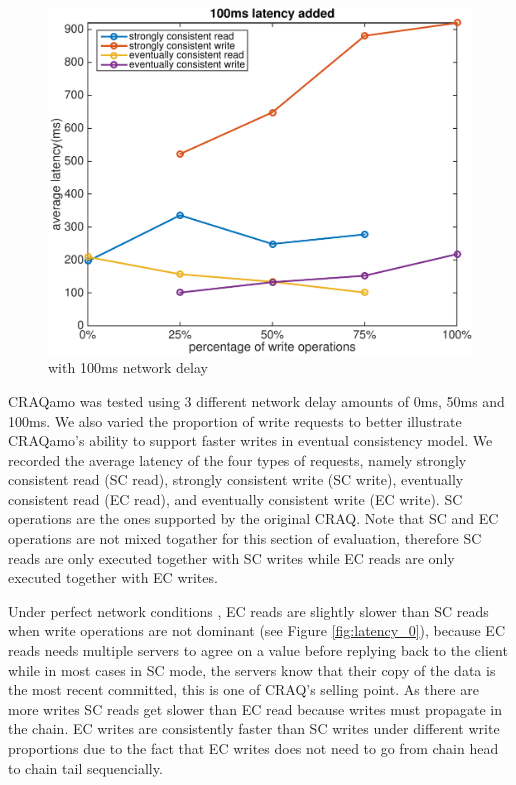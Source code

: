 \begin{figure}[hbt]
\centering
\includegraphics[width=\linewidth]{figures/latency_100.pdf}
\caption{with 100ms network delay}
\label{fig:latency_100}
\end{figure}
\vspace{-2mm}


CRAQamo was tested using 3 different network delay amounts of 0ms, 50ms and 100ms. We also varied the proportion of write requests to better illustrate CRAQamo's ability to support faster writes in eventual consistency model. We recorded the average latency of the four types of requests, namely strongly consistent read (SC read), strongly consistent write (SC write), eventually consistent read (EC read), and eventually consistent write (EC write). SC operations are the ones supported by the original CRAQ. Note that SC and EC operations are not mixed togather for this section of evaluation, therefore SC reads are only executed together with SC writes while EC reads are only executed together with EC writes. 

Under perfect network conditions , EC reads are slightly slower than SC reads when write operations are not dominant (see Figure \ref{fig:latency_0}), because EC reads needs multiple servers to agree on a value before replying back to the client while in most cases in SC mode, the servers know that their copy of the data is the most recent committed, this is one of CRAQ's selling point. As there are more writes SC reads get slower than EC read because writes must propagate in the chain. EC writes are consistently faster than SC writes under different write proportions due to the fact that EC writes does not need to go from chain head to chain tail sequencially.

